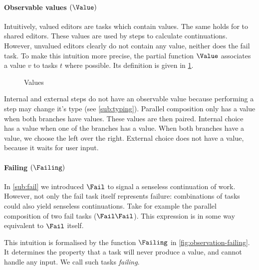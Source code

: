 \paragraph{Observable values $(\Value)$}

Intuitively, valued editors are tasks which contain values.
The same holds for to shared editors.
These values are used by steps to calculate continuations.
However, unvalued editors clearly do not contain any value,
neither does the fail task.
To make this intuition more precise,
the partial function $\Value$ associates a value $v$ to tasks $t$ where possible.
Its definition is given in \cref{fig:observation-value}.

\begin{figure}[h]
  \small
  \caption{Values} \label{fig:observation-value}
\end{figure}

Internal and external steps do not have an observable value because performing a step may change it's type (see \cref{sub:typing}).
Parallel composition only has a value when both branches have values.
These values are then paired.
Internal choice has a value when one of the branches has a value.
When both branches have a value, we choose the left over the right.
External choice does not have a value, because it waits for user input.



\paragraph{Failing $(\Failing)$}

In \cref{sub:fail} we introduced $\Fail$ to signal a senseless continuation of work.
However, not only the fail task itself represents failure:
combinations of tasks could also yield senseless continuations.
Take for example the parallel composition of two fail tasks ($\Fail \And \Fail$).
This expression is in some way equivalent to $\Fail$ itself.

This intuition is formalised by the function $\Failing$ in \cref{fig:observation-failing}.
It determines the property that a task
will never produce a value, and
cannot handle any input.
We call such tasks \emph{failing}.

